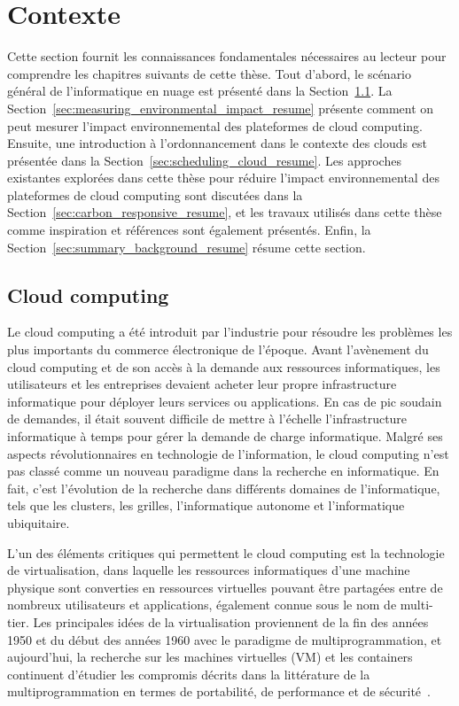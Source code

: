 
\section{Contexte}

Cette section fournit les connaissances fondamentales nécessaires au lecteur pour comprendre les chapitres suivants de cette thèse. Tout d'abord, le scénario général de l'informatique en nuage est présenté dans la Section~\ref{sec:cloud_resume}. La Section~\ref{sec:measuring_environmental_impact_resume} présente comment on peut mesurer l'impact environnemental des plateformes de cloud computing. Ensuite, une introduction à l'ordonnancement dans le contexte des clouds est présentée dans la Section~\ref{sec:scheduling_cloud_resume}. Les approches existantes explorées dans cette thèse pour réduire l'impact environnemental des plateformes de cloud computing sont discutées dans la Section~\ref{sec:carbon_responsive_resume}, et les travaux utilisés dans cette thèse comme inspiration et références sont également présentés. Enfin, la Section~\ref{sec:summary_background_resume} résume cette section.
\subsection{Cloud computing}

\label{sec:cloud_resume}

Le cloud computing a été introduit par l'industrie pour résoudre les problèmes les plus importants du commerce électronique de l'époque. Avant l'avènement du cloud computing et de son accès à la demande aux ressources informatiques, les utilisateurs et les entreprises devaient acheter leur propre infrastructure informatique pour déployer leurs services ou applications. En cas de pic soudain de demandes, il était souvent difficile de mettre à l'échelle l'infrastructure informatique à temps pour gérer la demande de charge informatique. Malgré ses aspects révolutionnaires en technologie de l'information, le cloud computing n'est pas classé comme un nouveau paradigme dans la recherche en informatique. En fait, c'est l'évolution de la recherche dans différents domaines de l'informatique, tels que les clusters, les grilles, l'informatique autonome et l'informatique ubiquitaire.

L'un des éléments critiques qui permettent le cloud computing est la technologie de virtualisation, dans laquelle les ressources informatiques d'une machine physique sont converties en ressources virtuelles pouvant être partagées entre de nombreux utilisateurs et applications, également connue sous le nom de multi-tier. Les principales idées de la virtualisation proviennent de la fin des années 1950 et du début des années 1960 avec le paradigme de multiprogrammation, et aujourd'hui, la recherche sur les machines virtuelles (VM) et les containers continuent d'étudier les compromis décrits dans la littérature de la multiprogrammation en termes de portabilité, de performance et de sécurité~\cite{randall2020_virtualization}.

